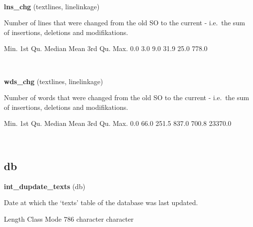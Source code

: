 \documentclass[]{article}
\newenvironment{Shaded}{\begin{snugshade}}{\end{snugshade}}
\newcommand{\DecValTok}[1]{\textcolor[rgb]{0.00,0.00,0.81}{{#1}}}
\newcommand{\FloatTok}[1]{\textcolor[rgb]{0.00,0.00,0.81}{{#1}}}
\newcommand{\NormalTok}[1]{{#1}}
\begin{document}
~

\vspace{1em}

\textbf{lns\_chg} (textlines, linelinkage)

Number of lines that were changed from the old SO to the current -
i.e.~the sum of insertions, deletions and modifikations.

\begin{Shaded}
\begin{Highlighting}[]
   \NormalTok{Min. 1st Qu.  Median    Mean 3rd Qu.    Max. }
    \FloatTok{0.0}     \FloatTok{3.0}     \FloatTok{9.0}    \FloatTok{31.9}    \FloatTok{25.0}   \FloatTok{778.0} 
\end{Highlighting}
\end{Shaded}

~

\vspace{1em}

\textbf{wds\_chg} (textlines, linelinkage)

Number of words that were changed from the old SO to the current -
i.e.~the sum of insertions, deletions and modifikations.

\begin{Shaded}
\begin{Highlighting}[]
   \NormalTok{Min. 1st Qu.  Median    Mean 3rd Qu.    Max. }
    \FloatTok{0.0}    \FloatTok{66.0}   \FloatTok{251.5}   \FloatTok{837.0}   \FloatTok{700.8} \FloatTok{23370.0} 
\end{Highlighting}
\end{Shaded}

~

\vspace{1em}

\subsection{db}\label{db}

\textbf{int\_dupdate\_texts} (db)

Date at which the `texts' table of the database was last updated.

\begin{Shaded}
\begin{Highlighting}[]
   \NormalTok{Length     Class      Mode }
      \DecValTok{786} \NormalTok{character character }
\end{Highlighting}
\end{Shaded}

~
\end{document}

